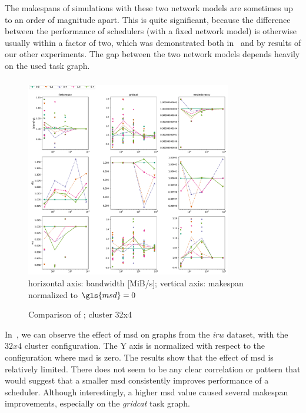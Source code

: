 The makespans of simulations with these two network models are sometimes up to an order of
magnitude apart. This is quite significant, because the difference between the performance of
schedulers (with a fixed network model) is otherwise usually within a factor of two, which was
demonstrated both in~\cite{wang2018list} and by results of our other experiments. The gap
between the two network models depends heavily on the used task graph.

\subsubsection*{}

\begin{figure}
	\centering
	\includegraphics[width=0.8\textwidth]{imgs/estee/charts/irw-32x4-schedtime-score}\\
	{\small horizontal axis: bandwidth [MiB/s]; vertical axis: makespan normalized to
	$\gls{msd}=0$}
	\caption{Comparison of ; cluster 32x4}
	\label{fig:estee-chart-irw-msd}
\end{figure}

In~, we can observe the effect of \gls{msd} on graphs from the
\emph{irw} dataset, with the $32x4$ cluster configuration. The Y axis
is normalized with respect to the configuration where \gls{msd} is zero. The results
show that the effect of \gls{msd} is relatively limited. There does not seem to be
any clear correlation or pattern that would suggest that a smaller \gls{msd}
consistently improves performance of a scheduler. Although interestingly, a higher
\gls{msd} value caused several makespan improvements, especially on the
\emph{gridcat} task graph.

